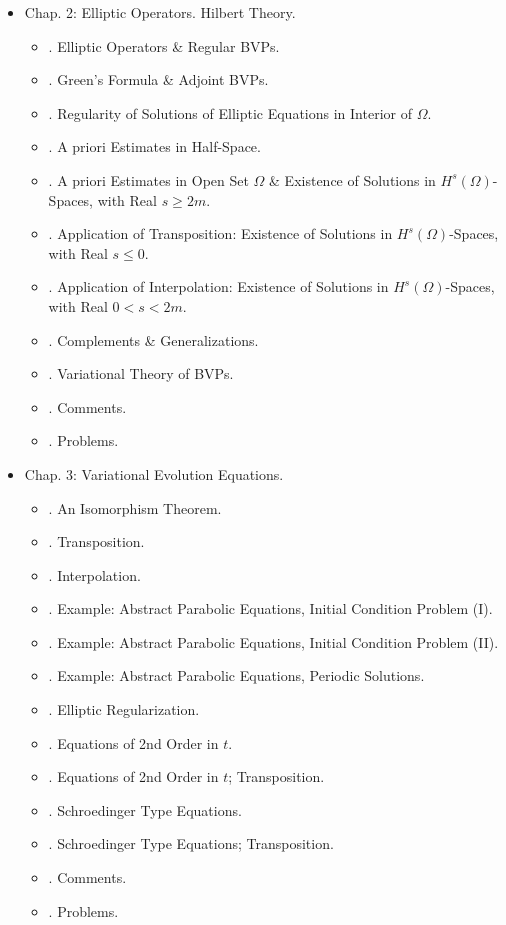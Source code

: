 \documentclass{article}
\begin{document}
\begin{enumerate}
\begin{itemize}
		\item {\sf Chap. 2: Elliptic Operators. Hilbert Theory.}
		\begin{itemize}
			\item {. Elliptic Operators \& Regular BVPs.}
			\item {. Green's Formula \& Adjoint BVPs.}
			\item {. Regularity of Solutions of Elliptic Equations in Interior of $\Omega$.}
			\item {. A priori Estimates in Half-Space.}
			\item {. A priori Estimates in Open Set $\Omega$ \& Existence of Solutions in $H^s(\Omega)$-Spaces, with Real $s\ge2m$.}
			\item {. Application of Transposition: Existence of Solutions in $H^s(\Omega)$-Spaces, with Real $s\le0$.}
			\item {. Application of Interpolation: Existence of Solutions in $H^s(\Omega)$-Spaces, with Real $0 < s < 2m$.}
			\item {. Complements \& Generalizations.}
			\item {. Variational Theory of BVPs.}
			\item {. Comments.}
			\item {. Problems.}
		\end{itemize}
		\item {\sf Chap. 3: Variational Evolution Equations.}
		\begin{itemize}
			\item {. An Isomorphism Theorem.}
			\item {. Transposition.}
			\item {. Interpolation.}
			\item {. Example: Abstract Parabolic Equations, Initial Condition Problem (I).}
			\item {. Example: Abstract Parabolic Equations, Initial Condition Problem (II).}
			\item {. Example: Abstract Parabolic Equations, Periodic Solutions.}
			\item {. Elliptic Regularization.}
			\item {. Equations of 2nd Order in $t$.}
			\item {. Equations of 2nd Order in $t$; Transposition.}
			\item {. Schroedinger Type Equations.}
			\item {. Schroedinger Type Equations; Transposition.}
			\item {. Comments.}
			\item {. Problems.}
		\end{itemize}
	\end{itemize}
	

\end{enumerate}
\end{document}
